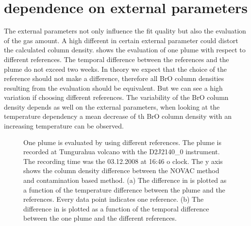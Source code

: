 \documentclass  [
  paper    = a4,
  BCOR     = 10mm,
  twoside,
  fontsize = 12pt,
  fleqn,
  toc      = bibnumbered,
  toc      = listofnumbered,
  numbers  = noendperiod,
  headings = normal,
  listof   = leveldown,
  version  = 3.03
]                                       {scrreprt}
\begin{document}
	\section{  dependence on external parameters}
	The external parameters not only influence the fit quality but also the evaluation of the gas amount. A high different in certain external parameter could distort the calculated   column density.  shows the evaluation of one plume with respect to different references. The temporal difference between the references and the plume do not exceed two weeks. In theory we expect that the choice of  the reference should not make a difference, therefore all BrO column densities resulting from the evaluation should be equivalent. But we can see a high variation if choosing different references. The variability of the BrO column density depends as well on the external parameters, when looking at the temperature dependency a mean decrease of th BrO column density with an increasing temperature can be observed.
		\begin{figure}
		\caption{One plume is evaluated by using different references. The plume is recorded at Tungurahua volcano with the D2J2140\_0 instrument. The recording time was the  03.12.2008  at 16:46 o clock. The y axis shows the   column density difference between the NOVAC method and contamination based method. (a) The difference in   is plotted as a function of the temperature difference between the plume and the references. Every data point indicates one reference. (b) The difference in   is plotted as a function of the temporal difference between the one plume and the different references.}
		\label{fig:d2j2140060218difftemperature-cbro}		
	\end{figure}
\end{document}
